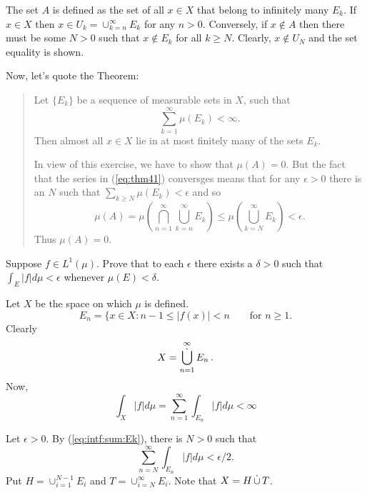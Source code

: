 \begin{enumerate}
The set $A$ is defined as the set of all \(x\in X\)
that belong to infinitely many \(E_k\).
If \(x\in X\) then \(x \in U_k = \cup_{k=n}^\infty E_k\) for any \(n>0\).
Conversely, if \(x\notin A\) then there must be some \(N>0\)
such that \(x\notin E_k\) for all \(k\geq N\).
Clearly, \(x\notin U_N\) and the set equality is shown.

Now, let's quote the Theorem:
\begin{quotation}
\setcounter{quotethm}{40} %
  \begin{quotethm}
   Let \(\{E_k\}\) be a sequence of measurable sets in $X$, such that
   \begin{equation} \label{eq:thm41}
        \sum_{k=1}^\infty \mu(E_k) < \infty.
   \end{equation}
   Then almost all \(x\in X\) lie in at most finitely many of the sets \(E_k\).
  \end{quotethm}
  In view of this exercise, we have to show that \(\mu(A) = 0\).
  But the fact that the series in (\ref{eq:thm41}) conversges
  means that for any \(\epsilon>0\) there is an $N$ such that
  \(\sum_{k\geq N} \mu(E_k) < \epsilon\) and so
  \begin{equation*}
    \mu(A)
    = \mu \left(\bigcap_{n=1}^\infty \bigcup_{k=n}^\infty E_k\right)
    \leq \mu \left(\bigcup_{k=N}^\infty E_k\right) < \epsilon.
  \end{equation*}
  Thus \(\mu(A) = 0\).
\end{quotation}



\begin{excopy}
Suppose \(f\in L^1(\mu)\). Prove that to each \(\epsilon\)
there exists a \(\delta > 0\) such that
\(\int_E |f|d\mu < \epsilon\) whenever \(\mu(E) < \delta\).
\end{excopy}

Let $X$ be the space on which \(\mu\) is defined.
\begin{equation*}
E_n = \{x\in X: n - 1 \leq |f(x)| < n
 \qquad \textrm{for } n\geq 1.
\end{equation*}
Clearly
\begin{equation*}
X = \Disjunion_{n=1}^\infty E_n\,.
\end{equation*}
Now,
\begin{equation} \label{eq:intf:sum:Ek}
\int_X |f|d\mu = \sum_{n=1}^\infty \int_{E_n} |f|d\mu < \infty
\end{equation}

Let \(\epsilon > 0\). By (\ref{eq:intf:sum:Ek}), there is
\(N>0\) such that
\begin{equation}
\sum_{n=N}^\infty \int_{E_n} |f|d\mu < \epsilon/2.
\end{equation}
Put \(H = \cup_{i=1}^{N-1} E_i\)
and \(T = \cup_{i=N}^\infty E_i\).
Note that \(X = H \disjunion T\).


\end{enumerate}
